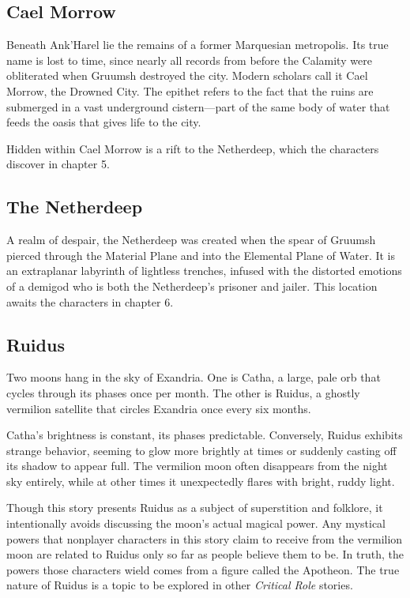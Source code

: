\documentclass[10pt,a4paper,twoside,bg=print,twocolumn,openany,nodeprecatedcode]{dndbook}
\begin{document}
\subsection{Cael Morrow}
Beneath Ank'Harel lie the remains of a former Marquesian metropolis. Its true name is lost to time, since nearly all records from before the Calamity were obliterated when Gruumsh destroyed the city. Modern scholars call it Cael Morrow, the Drowned City. The epithet refers to the fact that the ruins are submerged in a vast underground cistern—part of the same body of water that feeds the oasis that gives life to the city.

Hidden within Cael Morrow is a rift to the Netherdeep, which the characters discover in chapter 5.

\subsection{The Netherdeep}
A realm of despair, the Netherdeep was created when the spear of Gruumsh pierced through the Material Plane and into the Elemental Plane of Water. It is an extraplanar labyrinth of lightless trenches, infused with the distorted emotions of a demigod who is both the Netherdeep's prisoner and jailer. This location awaits the characters in chapter 6.

\subsection{Ruidus}
Two moons hang in the sky of Exandria. One is Catha, a large, pale orb that cycles through its phases once per month. The other is Ruidus, a ghostly vermilion satellite that circles Exandria once every six months.

Catha's brightness is constant, its phases predictable. Conversely, Ruidus exhibits strange behavior, seeming to glow more brightly at times or suddenly casting off its shadow to appear full. The vermilion moon often disappears from the night sky entirely, while at other times it unexpectedly flares with bright, ruddy light.

Though this story presents Ruidus as a subject of superstition and folklore, it intentionally avoids discussing the moon's actual magical power. Any mystical powers that nonplayer characters in this story claim to receive from the vermilion moon are related to Ruidus only so far as people believe them to be. In truth, the powers those characters wield comes from a figure called the Apotheon. The true nature of Ruidus is a topic to be explored in other \textit{Critical Role} stories.
\end{document}
